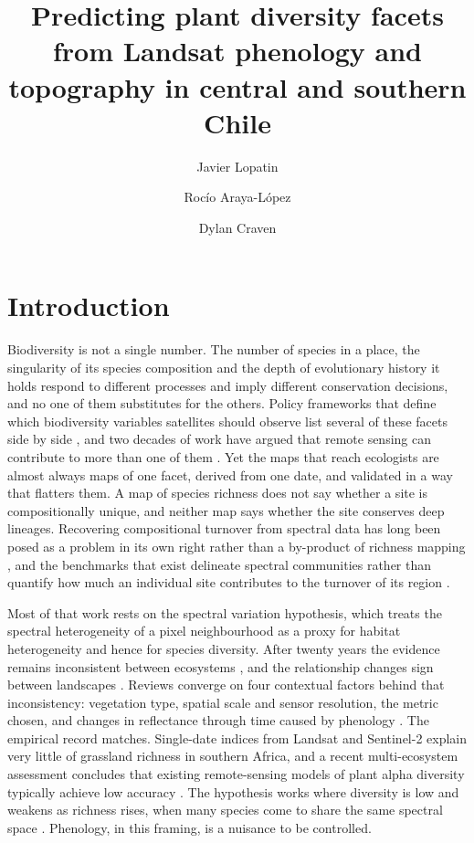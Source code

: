 \documentclass[preprint,12pt]{elsarticle}
\title{Predicting plant diversity facets from Landsat phenology and topography in central and southern Chile}
\author[1,2,3]{Javier Lopatin\corref{cor1}}
\author[4]{Rocío Araya-López}
\author[2,5]{Dylan Craven}
\begin{document}
\begin{frontmatter}

\begin{abstract}

\end{abstract}

\begin{keyword}

\end{keyword}

\end{frontmatter}

\linenumbers

\section{Introduction}

Biodiversity is not a single number. The number of species in a place, the singularity of
its species composition and the depth of evolutionary history it holds respond to different
processes and imply different conservation decisions, and no one of them substitutes for
the others. Policy frameworks that define which biodiversity variables satellites should
observe list several of these facets side by side \citep{skidmore2021priority}, and two
decades of work have argued that remote sensing can contribute to more than one of them
\citep{wang2019remote,cavenderbares2022integrating}. Yet the maps that reach ecologists are
almost always maps of one facet, derived from one date, and validated in a way that
flatters them. A map of species richness does not say whether a site is compositionally
unique, and neither map says whether the site conserves deep lineages. Recovering
compositional turnover from spectral data has long been posed as a problem in its own right
rather than a by-product of richness mapping \citep{rocchini2018measuring}, and the
benchmarks that exist delineate spectral communities rather than quantify how much an
individual site contributes to the turnover of its region \citep{rocchini2021from}.

Most of that work rests on the spectral variation hypothesis, which treats the spectral
heterogeneity of a pixel neighbourhood as a proxy for habitat heterogeneity and hence for
species diversity. After twenty years the evidence remains inconsistent between ecosystems
\citep{torresani2024reviewing,fassnacht2022about}, and the relationship changes sign
between landscapes \citep{schmidtlein2017the}. Reviews converge on four contextual factors
behind that inconsistency: vegetation type, spatial scale and sensor resolution, the metric
chosen, and changes in reflectance through time caused by phenology
\citep{lenormand2025spectral}. The empirical record matches. Single-date indices from
Landsat and Sentinel-2 explain very little of grassland richness in southern Africa, and a
recent multi-ecosystem assessment concludes that existing remote-sensing models of plant
alpha diversity typically achieve low accuracy \citep{wang2026plant}. The hypothesis works
where diversity is low \citep{hayden2024highresolution} and weakens as richness rises, when
many species come to share the same spectral space \citep{donnini2024spectral}. Phenology,
in this framing, is a nuisance to be controlled.
\end{document}
